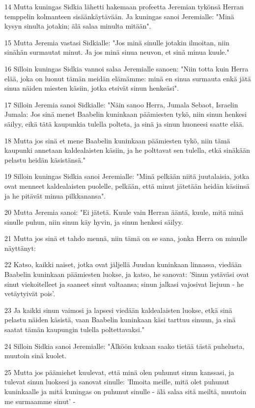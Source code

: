 \par 14 Mutta kuningas Sidkia lähetti hakemaan profeetta Jeremian tykönsä Herran temppelin kolmanteen sisäänkäytävään. Ja kuningas sanoi Jeremialle: "Minä kysyn sinulta jotakin; älä salaa minulta mitään".
\par 15 Mutta Jeremia vastasi Sidkialle: "Jos minä sinulle jotakin ilmoitan, niin sinähän surmautat minut. Ja jos minä sinua neuvon, et sinä minua kuule."
\par 16 Silloin kuningas Sidkia vannoi salaa Jeremialle sanoen: "Niin totta kuin Herra elää, joka on luonut tämän meidän elämämme: minä en sinua surmauta enkä jätä sinua näiden miesten käsiin, jotka etsivät sinun henkeäsi".
\par 17 Silloin Jeremia sanoi Sidkialle: "Näin sanoo Herra, Jumala Sebaot, Israelin Jumala: Jos sinä menet Baabelin kuninkaan päämiesten tykö, niin sinun henkesi säilyy, eikä tätä kaupunkia tulella polteta, ja sinä ja sinun huoneesi saatte elää.
\par 18 Mutta jos sinä et mene Baabelin kuninkaan päämiesten tykö, niin tämä kaupunki annetaan kaldealaisten käsiin, ja he polttavat sen tulella, etkä sinäkään pelastu heidän käsistänsä."
\par 19 Silloin kuningas Sidkia sanoi Jeremialle: "Minä pelkään niitä juutalaisia, jotka ovat menneet kaldealaisten puolelle, pelkään, että minut jätetään heidän käsiinsä ja he pitävät minua pilkkanansa".
\par 20 Mutta Jeremia sanoi: "Ei jätetä. Kuule vain Herran ääntä, kuule, mitä minä sinulle puhun, niin sinun käy hyvin, ja sinun henkesi säilyy.
\par 21 Mutta jos sinä et tahdo mennä, niin tämä on se sana, jonka Herra on minulle näyttänyt:
\par 22 Katso, kaikki naiset, jotka ovat jäljellä Juudan kuninkaan linnassa, viedään Baabelin kuninkaan päämiesten luokse, ja katso, he sanovat: 'Sinun ystäväsi ovat sinut viekoitelleet ja saaneet sinut valtaansa; sinun jalkasi vajosivat liejuun - he vetäytyivät pois'.
\par 23 Ja kaikki sinun vaimosi ja lapsesi viedään kaldealaisten luokse, etkä sinä pelastu näiden käsistä, vaan Baabelin kuninkaan käsi tarttuu sinuun, ja sinä saatat tämän kaupungin tulella poltettavaksi."
\par 24 Silloin Sidkia sanoi Jeremialle: "Älköön kukaan saako tietää tästä puhelusta, muutoin sinä kuolet.
\par 25 Mutta jos päämiehet kuulevat, että minä olen puhunut sinun kanssasi, ja tulevat sinun luoksesi ja sanovat sinulle: 'Ilmoita meille, mitä olet puhunut kuninkaalle ja mitä kuningas on puhunut sinulle - älä salaa sitä meiltä, muutoin me surmaamme sinut' -
